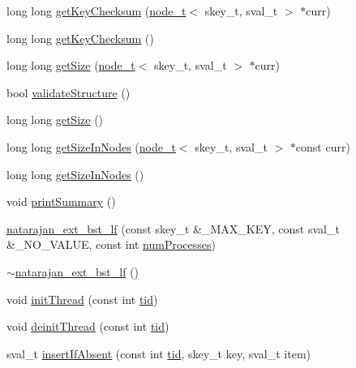 \begin{DoxyCompactItemize}
\item 
long long \hyperlink{classnatarajan__ext__bst__lf_a33ed925f7c23b46bf67a688d78e1714a}{get\+Key\+Checksum} (\hyperlink{structnode__t}{node\+\_\+t}$<$ skey\+\_\+t, sval\+\_\+t $>$ $\ast$curr)
\item 
long long \hyperlink{classnatarajan__ext__bst__lf_a6120769d8b8d6a14e673649d6ece6454}{get\+Key\+Checksum} ()
\item 
long long \hyperlink{classnatarajan__ext__bst__lf_a71a59c42d573aa3150a7a46d9ca94041}{get\+Size} (\hyperlink{structnode__t}{node\+\_\+t}$<$ skey\+\_\+t, sval\+\_\+t $>$ $\ast$curr)
\item 
bool \hyperlink{classnatarajan__ext__bst__lf_a95852943b22caf6203a7c86b31d501be}{validate\+Structure} ()
\item 
long long \hyperlink{classnatarajan__ext__bst__lf_ac8b9304e8bf0c244a0efb0467a385c23}{get\+Size} ()
\item 
long long \hyperlink{classnatarajan__ext__bst__lf_a39d920a7b800482d29679e70b79fb04e}{get\+Size\+In\+Nodes} (\hyperlink{structnode__t}{node\+\_\+t}$<$ skey\+\_\+t, sval\+\_\+t $>$ $\ast$const curr)
\item 
long long \hyperlink{classnatarajan__ext__bst__lf_aaf5630b2b2852d681914c9ac47b622fd}{get\+Size\+In\+Nodes} ()
\item 
void \hyperlink{classnatarajan__ext__bst__lf_a4d041c7fc819e57286e1907757a68895}{print\+Summary} ()
\item 
\hyperlink{classnatarajan__ext__bst__lf_a3004e0b831b62ffbe50fce8c0bccdd53}{natarajan\+\_\+ext\+\_\+bst\+\_\+lf} (const skey\+\_\+t \&\+\_\+\+M\+A\+X\+\_\+\+K\+EY, const sval\+\_\+t \&\+\_\+\+N\+O\+\_\+\+V\+A\+L\+UE, const int \hyperlink{testing_8cpp_aa085812188e21ede75351d88b9b2c30d}{num\+Processes})
\item 
\hyperlink{classnatarajan__ext__bst__lf_a3dfa7398463b014b9a1a86d4068dd7a5}{$\sim$natarajan\+\_\+ext\+\_\+bst\+\_\+lf} ()
\item 
void \hyperlink{classnatarajan__ext__bst__lf_a6e3a0c6117221f806dde9c903c90c9b6}{init\+Thread} (const int \hyperlink{microbench_2main_8cpp_a9ca9869868fe7e7a38a921cc7de4103f}{tid})
\item 
void \hyperlink{classnatarajan__ext__bst__lf_a51fbc22d01b758dad5a4a64d1d7e62bc}{deinit\+Thread} (const int \hyperlink{microbench_2main_8cpp_a9ca9869868fe7e7a38a921cc7de4103f}{tid})
\item 
sval\+\_\+t \hyperlink{classnatarajan__ext__bst__lf_acee96bf831b747c5c9c2541c5101f506}{insert\+If\+Absent} (const int \hyperlink{microbench_2main_8cpp_a9ca9869868fe7e7a38a921cc7de4103f}{tid}, skey\+\_\+t key, sval\+\_\+t item)

\end{DoxyCompactItemize}
